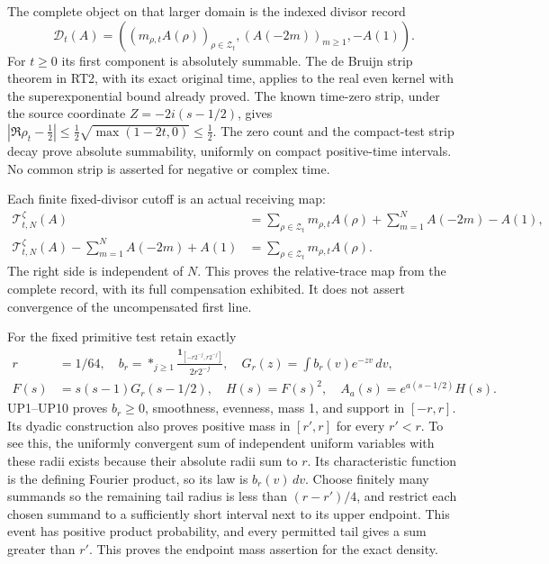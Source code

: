 \documentclass[
  10pt,
  a4paper,
]{article}
\begin{document}
The complete object on that larger domain is the indexed divisor record
\[
\mathcal D_t(A)=
\left((m_{\rho,t}A(\rho))_{\rho\in\mathcal Z_t},
(A(-2m))_{m\ge1},-A(1)\right).
\tag{OZH17}
\] For \(t\ge0\) its first component is absolutely summable. The de
Bruijn strip theorem in RT2, with its exact original time, applies to
the real even kernel with the superexponential bound already proved. The
known time-zero strip, under the source coordinate \(Z=-2i(s-1/2)\),
gives \(|\Re\rho_t-\frac12|\le\frac12\sqrt{\max(1-2t,0)}\le\frac12\).
The zero count and the compact-test strip decay prove absolute
summability, uniformly on compact positive-time intervals. No common
strip is asserted for negative or complex time.

Each finite fixed-divisor cutoff is an actual receiving map: \[
\begin{aligned}
\mathcal T_{t,N}^\zeta(A)&=
\sum_{\rho\in\mathcal Z_t}m_{\rho,t}A(\rho)
+\sum_{m=1}^N A(-2m)-A(1),\\
\mathcal T_{t,N}^\zeta(A)-\sum_{m=1}^N A(-2m)+A(1)
&=\sum_{\rho\in\mathcal Z_t}m_{\rho,t}A(\rho).
\end{aligned}\tag{OZH18}
\] The right side is independent of \(N\). This proves the
relative-trace map from the complete record, with its full compensation
exhibited. It does not assert convergence of the uncompensated first
line.

For the fixed primitive test retain exactly \[
\begin{aligned}
r&=1/64,\quad b_r=*_{j\ge1}
\frac{\mathbf1_{[-r2^{-j},r2^{-j}]}}{2r2^{-j}},\quad
G_r(z)=\int b_r(v)e^{-zv}\,dv,\\
F(s)&=s(s-1)G_r(s-1/2),\quad H(s)=F(s)^2,\quad
A_a(s)=e^{a(s-1/2)}H(s).
\end{aligned}\tag{OZH19}
\] UP1--UP10 proves \(b_r\ge0\), smoothness, evenness, mass 1, and
support in \([-r,r]\). Its dyadic construction also proves positive mass
in \([r',r]\) for every \(r'<r\). To see this, the uniformly convergent
sum of independent uniform variables with these radii exists because
their absolute radii sum to \(r\). Its characteristic function is the
defining Fourier product, so its law is \(b_r(v)\,dv\). Choose finitely
many summands so the remaining tail radius is less than \((r-r')/4\),
and restrict each chosen summand to a sufficiently short interval next
to its upper endpoint. This event has positive product probability, and
every permitted tail gives a sum greater than \(r'\). This proves the
endpoint mass assertion for the exact density.
\end{document}

